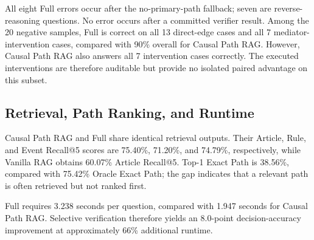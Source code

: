 All eight Full errors occur after the no-primary-path fallback; seven are
reverse-reasoning questions. No error occurs after a committed verifier result.
Among the 20 negative samples, Full is correct on all 13 direct-edge cases and
all 7 mediator-intervention cases, compared with 90\% overall for Causal Path
RAG. However, Causal Path RAG also answers all 7 intervention cases correctly.
The executed interventions are therefore auditable but provide no isolated
paired advantage on this subset.

\subsection{Retrieval, Path Ranking, and Runtime}

Causal Path RAG and Full share identical retrieval outputs. Their Article,
Rule, and Event Recall@5 scores are 75.40\%, 71.20\%, and 74.79\%,
respectively, while Vanilla RAG obtains 60.07\% Article Recall@5. Top-1 Exact
Path is 38.56\%, compared with 75.42\% Oracle Exact Path; the gap indicates
that a relevant path is often retrieved but not ranked first.

Full requires 3.238 seconds per question, compared with 1.947 seconds for
Causal Path RAG. Selective verification therefore yields an 8.0-point
decision-accuracy improvement at approximately 66\% additional runtime.
